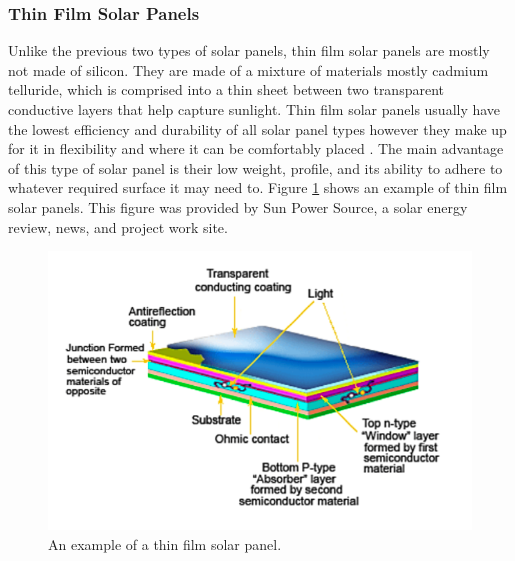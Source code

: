 \subsubsection{Thin Film Solar Panels}
Unlike the previous two types of solar panels, thin film solar panels are mostly not made of silicon. They are made of a mixture of materials mostly cadmium telluride, which is comprised into a thin sheet between two transparent conductive layers that help capture sunlight. Thin film solar panels usually have the lowest efficiency and durability of all solar panel types however they make up for it in flexibility and where it can be comfortably placed . The main advantage of this type of solar panel is their low weight, profile, and its ability to adhere to whatever required surface it may need to. Figure \ref{fig:thin-film-sp} shows an example of thin film solar panels. This figure was provided by Sun Power Source, a solar energy review, news, and project work site.
\cite{Thin-Film-Solar-Cell}
\begin{figure}
    \centering
    \includegraphics[scale=0.4]{figures/thin film solar.png}
    \caption{An example of a thin film solar panel.}
    \label{fig:thin-film-sp} 
\end{figure}


